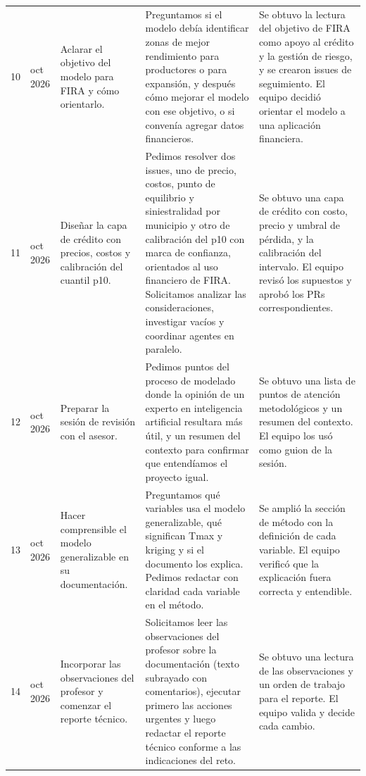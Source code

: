 \documentclass[10pt,letterpaper]{article}
\begin{document}
\begin{longtable}{@{}r >{\raggedright\arraybackslash}p{1.2cm} >{\raggedright\arraybackslash}p{2.7cm} >{\raggedright\arraybackslash}p{4.1cm} >{\raggedright\arraybackslash}p{4.5cm}@{}}
10 & 14 oct 2026 & Aclarar el objetivo del modelo para FIRA y cómo orientarlo. & Preguntamos si el modelo debía identificar zonas de mejor rendimiento para productores o para expansión, y después cómo mejorar el modelo con ese objetivo, o si convenía agregar datos financieros. & Se obtuvo la lectura del objetivo de FIRA como apoyo al crédito y la gestión de riesgo, y se crearon issues de seguimiento. El equipo decidió orientar el modelo a una aplicación financiera. \\
11 & 14 oct 2026 & Diseñar la capa de crédito con precios, costos y calibración del cuantil p10. & Pedimos resolver dos issues, uno de precio, costos, punto de equilibrio y siniestralidad por municipio y otro de calibración del p10 con marca de confianza, orientados al uso financiero de FIRA. Solicitamos analizar las consideraciones, investigar vacíos y coordinar agentes en paralelo. & Se obtuvo una capa de crédito con costo, precio y umbral de pérdida, y la calibración del intervalo. El equipo revisó los supuestos y aprobó los PRs correspondientes. \\
12 & 14 oct 2026 & Preparar la sesión de revisión con el asesor. & Pedimos puntos del proceso de modelado donde la opinión de un experto en inteligencia artificial resultara más útil, y un resumen del contexto para confirmar que entendíamos el proyecto igual. & Se obtuvo una lista de puntos de atención metodológicos y un resumen del contexto. El equipo los usó como guion de la sesión. \\
13 & 14 oct 2026 & Hacer comprensible el modelo generalizable en su documentación. & Preguntamos qué variables usa el modelo generalizable, qué significan Tmax y kriging y si el documento los explica. Pedimos redactar con claridad cada variable en el método. & Se amplió la sección de método con la definición de cada variable. El equipo verificó que la explicación fuera correcta y entendible. \\
14 & 15 oct 2026 & Incorporar las observaciones del profesor y comenzar el reporte técnico. & Solicitamos leer las observaciones del profesor sobre la documentación (texto subrayado con comentarios), ejecutar primero las acciones urgentes y luego redactar el reporte técnico conforme a las indicaciones del reto. & Se obtuvo una lectura de las observaciones y un orden de trabajo para el reporte. El equipo valida y decide cada cambio. \\

\bottomrule
\end{longtable}
\normalsize
\end{document}
